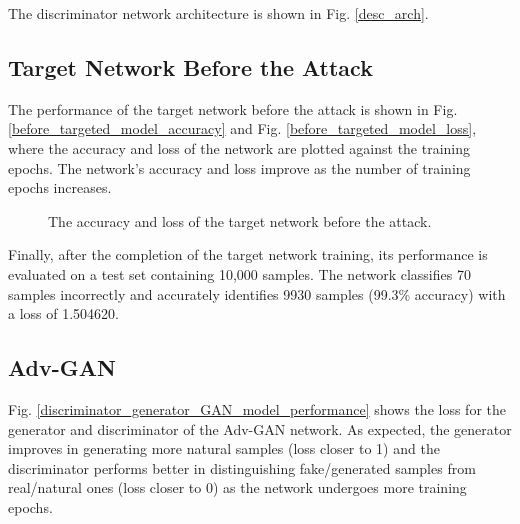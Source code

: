 \documentclass[lettersize,journal]{IEEEtran}
\begin{document}
The discriminator network architecture is shown in Fig. \ref{desc_arch}.

\subsection*{Target Network Before the Attack}
The performance of the target network before the attack is shown in Fig. \ref{before_targeted_model_accuracy} and Fig. \ref{before_targeted_model_loss}, where the accuracy and loss of the network are plotted against the training epochs. The network's accuracy and loss improve as the number of training epochs increases.
\begin{figure}[!t]
\centering
{}
\caption{The accuracy and loss of the target network before the attack.}
\end{figure}

Finally, after the completion of the target network training, its performance is evaluated on a test set containing 10,000 samples. The network classifies 70 samples incorrectly and accurately identifies 9930 samples (99.3\% accuracy) with a loss of 1.504620.

\subsection*{Adv-GAN}
Fig. \ref{discriminator_generator_GAN_model_performance} shows the loss for the generator and discriminator of the Adv-GAN network. As expected, the generator improves in generating more natural samples (loss closer to 1) and the discriminator performs better in distinguishing fake/generated samples from real/natural ones (loss closer to 0) as the network undergoes more training epochs.
\end{document}
